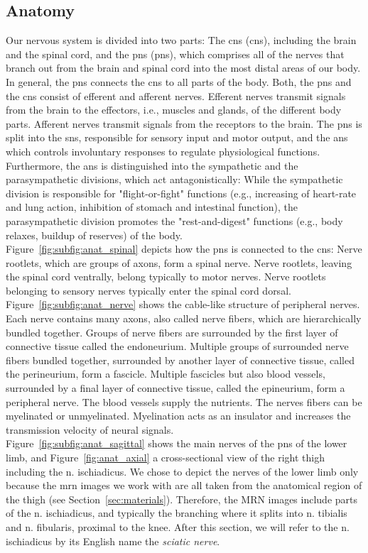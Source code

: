 \subsection{Anatomy}
Our nervous system is divided into two parts: The \acrlong{cns} (\acrshort{cns}), including the brain and the spinal cord, and the \acrlong{pns} (\acrshort{pns}), which comprises all of the nerves that branch out from the brain and spinal cord into the most distal areas of our body. In general, the \gls{pns} connects the \gls{cns} to all parts of the body. Both, the \gls{pns} and the \gls{cns} consist of efferent and afferent nerves. Efferent nerves transmit signals from the brain to the effectors, i.e., muscles and glands, of the different body parts. Afferent nerves transmit signals from the receptors to the brain. The \gls{pns} is split into the \gls{sns}, responsible for sensory input and motor output, and the \gls{ans} which controls involuntary responses to regulate physiological functions. Furthermore, the \gls{ans} is distinguished into the sympathetic and the parasympathetic divisions, which act antagonistically: While the sympathetic division is responsible for "flight-or-fight" functions (e.g., increasing of heart-rate and lung action, inhibition of stomach and intestinal function), the parasympathetic division promotes the "rest-and-digest" functions (e.g., body relaxes, buildup of reserves) of the body.\\
Figure~\ref{fig:subfig:anat_spinal} depicts how the \gls{pns} is connected to the \gls{cns}: Nerve rootlets, which are groups of axons, form a spinal nerve. Nerve rootlets, leaving the spinal cord ventrally, belong typically to motor nerves. Nerve rootlets belonging to sensory nerves typically enter the spinal cord dorsal.\\ Figure~\ref{fig:subfig:anat_nerve} shows the cable-like structure of peripheral nerves. Each nerve contains many axons, also called nerve fibers, which are hierarchically bundled together. Groups of nerve fibers are surrounded by the first layer of connective tissue called the endoneurium. Multiple groups of surrounded nerve fibers bundled together, surrounded by another layer of connective tissue, called the perineurium, form a fascicle. Multiple fascicles but also blood vessels, surrounded by a final layer of connective tissue, called the epineurium, form a peripheral nerve. The blood vessels supply the nutrients. The nerves fibers can be myelinated or unmyelinated. Myelination acts as an insulator and increases the transmission velocity of neural signals.\\
Figure~\ref{fig:subfig:anat_sagittal} shows the main nerves of the \gls{pns} of the lower limb, and  Figure~\ref{fig:anat_axial} a cross-sectional view of the right thigh including the \gls{n.} ischiadicus. We chose to depict the nerves of the lower limb only because the \acrshort{mrn} images we work with are all taken from the anatomical region of the thigh (see Section~\ref{sec:materials}). Therefore, the MRN images include parts of the \gls{n.} ischiadicus, and typically the branching where it splits into \gls{n.} tibialis and \gls{n.} fibularis, proximal to the knee. After this section, we will refer to the \gls{n.} ischiadicus by its English name the \textit{sciatic nerve}.

